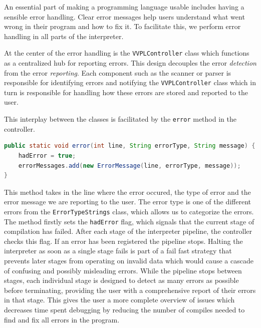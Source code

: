 
An essential part of making a programming language usable includes having a sensible error handling.
Clear error messages help users understand what went wrong in their program and how to fix it.
To facilitate this, we perform error handling in all parts of the interpreter.

At the center of the error handling is the \texttt{VVPLController} class which functions as a centralized hub for
reporting errors. This design decouples the error \emph{detection} from the error \emph{reporting}.
Each component such as the scanner or parser is responsible for identifying errors and notifying the
\texttt{VVPLController} class which in turn is responsible for handling how these errors are stored
and reported to the user.

This interplay between the classes is facilitated by the \texttt{error} method in the controller.
\begin{lstlisting}[language=java]
public static void error(int line, String errorType, String message) {
    hadError = true;
    errorMessages.add(new ErrorMessage(line, errorType, message));
}
\end{lstlisting}

This method takes in the line where the error occured, the type of error and the error message we are reporting to the user. 
The error type is one of the different errors from the \texttt{ErrorTypeStrings} class, which allows us to categorize the errors.
The method firstly sets the \texttt{hadError} flag, which signals that the current stage of compilation has failed.
After each stage of the interpreter pipeline, the controller checks this flag. If an error has been registered the pipeline stops.
Halting the interpreter as soon as a single stage fails is part of a fail fast strategy that prevents later stages from operating 
on invalid data which would cause a cascade of confusing and possibly misleading errors.
While the pipeline stops between stages, each individual stage is designed to detect as many errors as possible before terminating,
providing the user with a comprehensive report of their errors in that stage.
This gives the user a more complete overview of issues which decreases time spent debugging by
reducing the number of compiles needed to find and fix all errors in the program.

